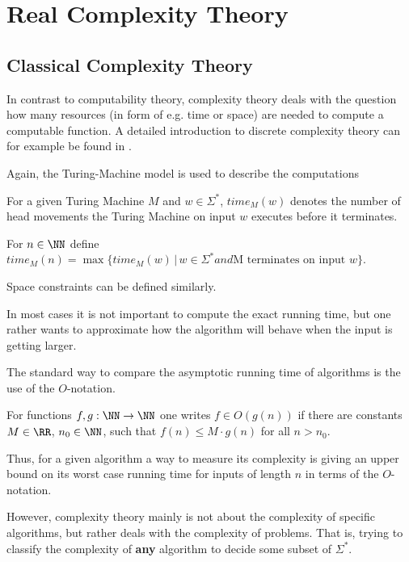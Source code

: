 \section{Real Complexity Theory}\label{section:real_complexity}
	\subsection{Classical Complexity Theory}
    In contrast to computability theory, complexity theory deals with the
    question how many resources (in form of e.g. time or space) are needed to
    compute a computable function.
    A detailed introduction to discrete complexity theory can for example be
    found in \cite{complexity}.

    Again, the Turing-Machine model is used to describe the computations
		\begin{definition}
			For a given Turing Machine $M$ and $w \in \Sigma^*$, $time_M(w)$ denotes the number of head movements 
			the Turing Machine on input $w$ executes before it terminates. 

			For $n \in \NN$ define $time_M(n) = \max \{ time_M(w) \,|\, w \in
        \Sigma^* and \text{M terminates on input }w \}$.

        Space constraints can be defined similarly.
		\end{definition}
    In most cases it is not important to compute the exact running time, but
    one rather wants to approximate how the algorithm will behave when the
    input is getting larger.
    
    The standard way to compare the asymptotic running time of algorithms is
    the use of the $O$-notation.
		\begin{definition}
			For functions $f, g: \NN \to \NN$ one writes $f \in O(g(n))$ if there are constants $M \in \RR$, $n_0 \in \NN$, such that
			$ f(n) \leq M \cdot g(n)$ for all $n > n_0$. 
		\end{definition}
			Thus, for a given algorithm a way to measure its complexity is giving an
      upper bound on its worst case running time for inputs of length $n$ in
      terms of the $O$-notation. 

			However, complexity theory mainly is not about the complexity of specific
      algorithms, but rather deals with the complexity of problems. 
      That is, trying to classify the complexity of \textbf{any} algorithm to
      decide some subset of $\Sigma^*$.
      
